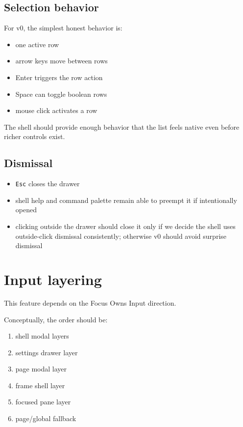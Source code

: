 \subsection{Selection behavior}\label{record-057-selection-behavior}

For v0, the simplest honest behavior is:

\begin{itemize}
\tightlist
\item
  one active row
\item
  arrow keys move between rows
\item
  Enter triggers the row action
\item
  Space can toggle boolean rows
\item
  mouse click activates a row
\end{itemize}

The shell should provide enough behavior that the list feels native even before richer controls exist.

\subsection{Dismissal}\label{record-057-dismissal}

\begin{itemize}
\tightlist
\item
  \texttt{E\allowbreak{}s\allowbreak{}c} closes the drawer
\item
  shell help and command palette remain able to preempt it if intentionally opened
\item
  clicking outside the drawer should close it only if we decide the shell uses outside-click dismissal consistently; otherwise v0 should avoid surprise dismissal
\end{itemize}

\section{Input layering}\label{record-057-input-layering}

This feature depends on the Focus Owns Input direction.

Conceptually, the order should be:

\begin{enumerate}
\def\labelenumi{\arabic{enumi}.}
\tightlist
\item
  shell modal layers
\item
  settings drawer layer
\item
  page modal layer
\item
  frame shell layer
\item
  focused pane layer
\item
  page/global fallback
\end{enumerate}

